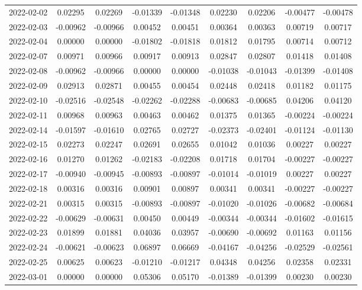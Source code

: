 {\begin{footnotesize}
\begin{longtable}{lcccccccc}
2022-02-02 & 0.02295 & 0.02269 & -0.01339 & -0.01348 & 0.02230 & 0.02206 & -0.00477 & -0.00478 \\
2022-02-03 & -0.00962 & -0.00966 & 0.00452 & 0.00451 & 0.00364 & 0.00363 & 0.00719 & 0.00717 \\
2022-02-04 & 0.00000 & 0.00000 & -0.01802 & -0.01818 & 0.01812 & 0.01795 & 0.00714 & 0.00712 \\
2022-02-07 & 0.00971 & 0.00966 & 0.00917 & 0.00913 & 0.02847 & 0.02807 & 0.01418 & 0.01408 \\
2022-02-08 & -0.00962 & -0.00966 & 0.00000 & 0.00000 & -0.01038 & -0.01043 & -0.01399 & -0.01408 \\
2022-02-09 & 0.02913 & 0.02871 & 0.00455 & 0.00454 & 0.02448 & 0.02418 & 0.01182 & 0.01175 \\
2022-02-10 & -0.02516 & -0.02548 & -0.02262 & -0.02288 & -0.00683 & -0.00685 & 0.04206 & 0.04120 \\
2022-02-11 & 0.00968 & 0.00963 & 0.00463 & 0.00462 & 0.01375 & 0.01365 & -0.00224 & -0.00224 \\
2022-02-14 & -0.01597 & -0.01610 & 0.02765 & 0.02727 & -0.02373 & -0.02401 & -0.01124 & -0.01130 \\
2022-02-15 & 0.02273 & 0.02247 & 0.02691 & 0.02655 & 0.01042 & 0.01036 & 0.00227 & 0.00227 \\
2022-02-16 & 0.01270 & 0.01262 & -0.02183 & -0.02208 & 0.01718 & 0.01704 & -0.00227 & -0.00227 \\
2022-02-17 & -0.00940 & -0.00945 & -0.00893 & -0.00897 & -0.01014 & -0.01019 & 0.00227 & 0.00227 \\
2022-02-18 & 0.00316 & 0.00316 & 0.00901 & 0.00897 & 0.00341 & 0.00341 & -0.00227 & -0.00227 \\
2022-02-21 & 0.00315 & 0.00315 & -0.00893 & -0.00897 & -0.01020 & -0.01026 & -0.00682 & -0.00684 \\
2022-02-22 & -0.00629 & -0.00631 & 0.00450 & 0.00449 & -0.00344 & -0.00344 & -0.01602 & -0.01615 \\
2022-02-23 & 0.01899 & 0.01881 & 0.04036 & 0.03957 & -0.00690 & -0.00692 & 0.01163 & 0.01156 \\
2022-02-24 & -0.00621 & -0.00623 & 0.06897 & 0.06669 & -0.04167 & -0.04256 & -0.02529 & -0.02561 \\
2022-02-25 & 0.00625 & 0.00623 & -0.01210 & -0.01217 & 0.04348 & 0.04256 & 0.02358 & 0.02331 \\
2022-03-01 & 0.00000 & 0.00000 & 0.05306 & 0.05170 & -0.01389 & -0.01399 & 0.00230 & 0.00230 \\

\end{longtable}
\end{footnotesize}}
